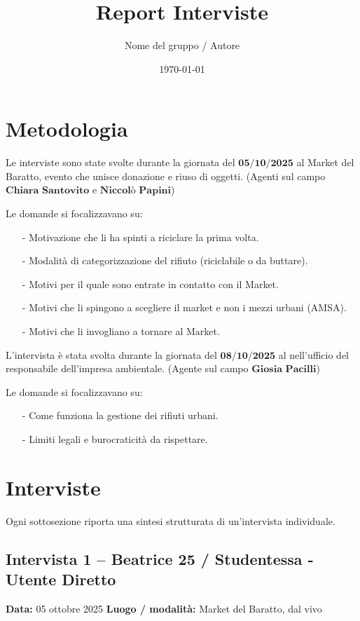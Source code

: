 \documentclass[12pt,a4paper]{article}
\title{Report Interviste}
\author{Nome del gruppo / Autore}
\date{\today}
\begin{document}
\maketitle
\tableofcontents
\newpage

\section{Metodologia}
Le interviste sono state svolte durante la giornata del $\textbf{05/10/2025}$ al Market del Baratto, evento che unisce donazione e riuso di oggetti. (Agenti sul campo $\textbf{Chiara Santovito}$ e $\textbf{Niccolò Papini}$) 

Le domande si focalizzavano su:
\begin{itemize}
  \item [-] Motivazione che li ha spinti a riciclare la prima volta.
  \item [-] Modalità di categorizzazione del rifiuto (riciclabile o da buttare).
  \item [-] Motivi per il quale sono entrate in contatto con il Market.
  \item [-] Motivi che li spingono a scegliere il market e non i mezzi urbani (AMSA).
  \item [-] Motivi che li invogliano a tornare al Market.
\end{itemize}

L'intervista è stata svolta durante la giornata del $\textbf{08/10/2025}$ al nell'ufficio del responsabile dell'impresa ambientale. (Agente sul campo $\textbf{Giosia Pacilli}$) 

Le domande si focalizzavano su:
\begin{itemize}
  \item [-] Come funziona la gestione dei rifiuti urbani.
  \item [-] Limiti legali e burocraticità da rispettare.
\end{itemize}

\newpage


\section{Interviste}
Ogni sottosezione riporta una sintesi strutturata di un'intervista individuale.

\subsection{Intervista 1 – Beatrice 25 / Studentessa - Utente Diretto}
\textbf{Data:} 05 ottobre 2025  
\textbf{Luogo / modalità:} Market del Baratto, dal vivo  
\end{document}

